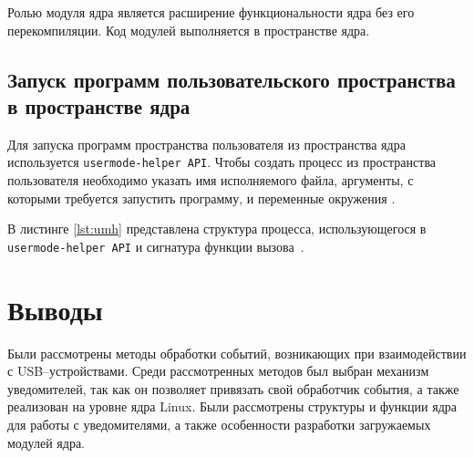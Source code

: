 Ролью модуля ядра является расширение функциональности ядра без его перекомпиляции. Код модулей выполняется в пространстве ядра.

\subsection{Запуск программ пользовательского пространства в пространстве ядра}

Для запуска программ пространства пользователя из пространства ядра используется \texttt{usermode-helper API}. Чтобы создать процесс из пространства пользователя необходимо указать имя исполняемого файла, аргументы, с которыми требуется запустить программу, и переменные окружения \cite{umhelper}.

В листинге \ref{lst:umh} представлена структура процесса, использующегося в \texttt{usermode-helper API} и сигнатура функции вызова~\cite{umh}.

    
\section*{Выводы}

Были рассмотрены методы обработки событий, возникающих при взаимодействии с USB--устройствами. Среди рассмотренных методов был выбран механизм уведомителей, так как он позволяет привязать свой обработчик события, а также реализован на уровне ядра Linux. Были рассмотрены структуры и функции ядра для работы с уведомителями, а также особенности разработки загружаемых модулей ядра.
